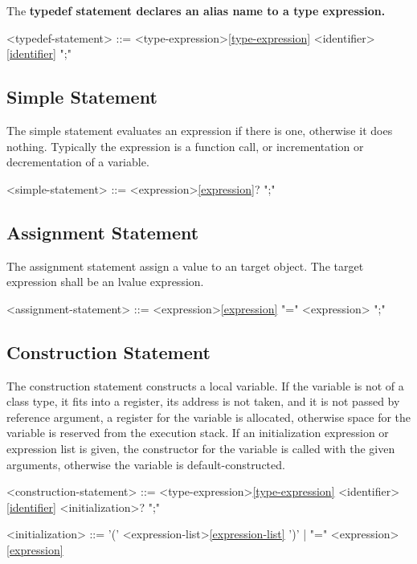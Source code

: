 \documentclass[a4paper,oneside,11pt]{article}
\begin{document}
The \bf{typedef} statement declares an alias name to a type expression.

\begin{grammar}
\label{typedef-statement}<typedef-statement> ::=  <type-expression>\ref{type-expression} <identifier>\ref{identifier} ";"
\end{grammar}

\subsection{Simple Statement}

The simple statement evaluates an expression if there is one, otherwise it does nothing.
Typically the expression is a function call, or incrementation or decrementation of a variable.

\begin{grammar}
\label{simple-statement}<simple-statement> ::= <expression>\ref{expression}? ";"
\end{grammar}

\subsection{Assignment Statement}

The assignment statement assign a value to an target object. The target expression shall be an lvalue expression.

\begin{grammar}
\label{assignment-statement}<assignment-statement> ::= <expression>\ref{expression} "=" <expression> ";"
\end{grammar}

\subsection{Construction Statement}

The construction statement constructs a local variable.
If the variable is not of a class type, it fits into a register, its address is not taken,
and it is not passed by reference argument, a register for the variable is allocated,
otherwise space for the variable is reserved from the execution stack.
If an initialization expression or expression list is given, the constructor for the variable is called with the given arguments,
otherwise the variable is default-constructed.

\begin{grammar}
\label{construction-statement}<construction-statement> ::= <type-expression>\ref{type-expression} <identifier>\ref{identifier} <initialization>? ";"

<initialization> ::= '(' <expression-list>\ref{expression-list} ')' | "=" <expression>\ref{expression}
\end{grammar}
\end{document}
